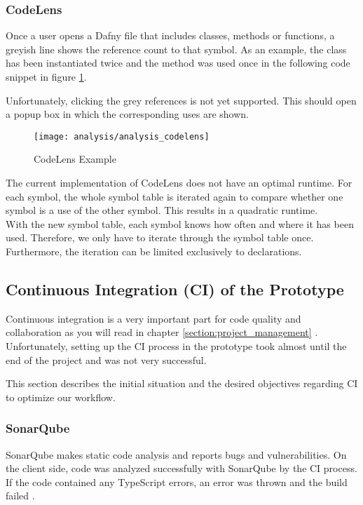 \subsubsection{CodeLens}
Once a user opens a Dafny file that includes classes, methods or functions, a greyish line shows the reference count to that symbol.
As an example, the class  has been instantiated twice and the method  was used once in the following code snippet in figure \ref{fig:analysis_codelens}.

Unfortunately, clicking the grey references is not yet supported.
This should open a popup box in which the corresponding uses are shown.

\begin{figure}[H]
    \centering
    \texttt{[image: analysis/analysis\_codelens]}
    \caption{CodeLens Example}
    \label{fig:analysis_codelens}
\end{figure}

The current implementation of CodeLens does not have an optimal runtime.
For each symbol, the whole symbol table is iterated again to compare whether one symbol is a use of the other symbol.
This results in a quadratic runtime. \\

With the new symbol table, each symbol knows how often and where it has been used.
Therefore, we only have to iterate through the symbol table once.
Furthermore, the iteration can be limited exclusively to declarations.

\subsection{Continuous Integration (CI) of the Prototype}
\label{section:analysis:CI}
Continuous integration is a very important part for code quality and collaboration
as you will read in chapter \ref{section:project_management} \textendash{} .
Unfortunately, setting up the CI process in the prototype took almost until the end of the project
and was not very successful. 

This section describes the initial situation and the desired objectives regarding CI to optimize our workflow.

\subsubsection{SonarQube}
SonarQube makes static code analysis and reports bugs and vulnerabilities.
On the client side, code was analyzed successfully with SonarQube by the CI process.
If the code contained any TypeScript errors, an error was thrown and the build failed \cite{sa}. \\

